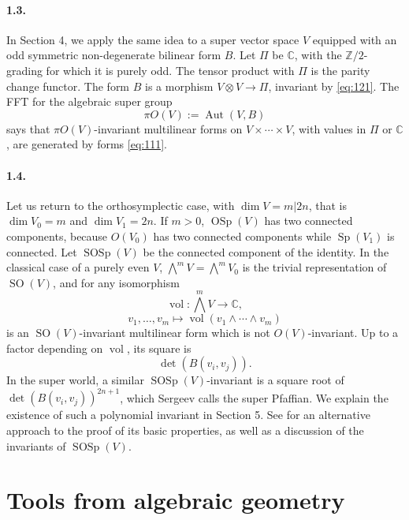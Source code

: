 \documentclass[11pt]{article}
\newcommand{\C}{\mathbb C}
\newcommand{\Z}{\mathbb Z}
\newcommand{\Aut}{\operatorname{Aut}}
\newcommand{\OSp}{\operatorname{OSp}}
\newcommand{\SOSp}{\operatorname{SOSp}}
\newcommand{\SO}{\operatorname{SO}}
\newcommand{\Sp}{\operatorname{Sp}}
\begin{document}
\paragraph{1.3.}
In Section 4, we apply the same idea to a super vector space $V$ equipped with an odd symmetric non-degenerate bilinear form $B$. Let $\Pi$ be $\C$, with the $\Z/2$-grading for which it is purely odd. The tensor product with $\Pi$ is the parity change functor. The form $B$ is a morphism $V\otimes V\to \Pi$, invariant by \eqref{eq:121}. The FFT for the algebraic super group
\[
\pi O(V):=\Aut(V,B)
\]
says that $\pi O(V)$-invariant multilinear forms on $V\times\cdots\times V$, with values in $\Pi$ or $\C$, are generated by forms \eqref{eq:111}.

\paragraph{1.4.}
Let us return to the orthosymplectic case, with $\dim V=m|2n$, that is $\dim V_0=m$ and $\dim V_1=2n$. If $m>0$, $\OSp(V)$ has two connected components, because $O(V_0)$ has two connected components while $\Sp(V_1)$ is connected. Let $\SOSp(V)$ be the connected component of the identity. In the classical case of a purely even $V$, $\bigwedge^m V=\bigwedge^m V_0$ is the trivial representation of $\SO(V)$, and for any isomorphism
\[
\operatorname{vol}:\bigwedge^m V\longrightarrow \C,
\]
\[
v_1,\ldots,v_m\longmapsto \operatorname{vol}(v_1\wedge\cdots\wedge v_m)
\]
is an $\SO(V)$-invariant multilinear form which is not $O(V)$-invariant. Up to a factor depending on $\operatorname{vol}$, its square is
\[
\det(B(v_i,v_j)).
\]
In the super world, a similar $\SOSp(V)$-invariant is a square root of $\det(B(v_i,v_j))^{2n+1}$, which Sergeev calls the super Pfaffian. We explain the existence of such a polynomial invariant in Section 5. See \cite{LZ15} for an alternative approach to the proof of its basic properties, as well as a discussion of the invariants of $\SOSp(V)$.

\section{Tools from algebraic geometry}
\end{document}
